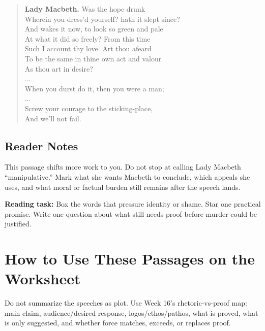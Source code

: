 \documentclass[12pt]{article}
\newenvironment{playpassage}{\begin{quote}\footnotesize\setlength{\parskip}{0.08em}\setlength{\parindent}{0pt}}{\end{quote}}
\newcommand{\speaker}[1]{\textbf{#1.}}
\begin{document}
\begin{playpassage}
\speaker{Lady Macbeth} Was the hope drunk\\
Wherein you dress'd yourself? hath it slept since?\\
And wakes it now, to look so green and pale\\
At what it did so freely? From this time\\
Such I account thy love. Art thou afeard\\
To be the same in thine own act and valour\\
As thou art in desire?\\
...\\
When you durst do it, then you were a man;\\
...\\
Screw your courage to the sticking-place,\\
And we'll not fail.
\end{playpassage}

\subsection*{Reader Notes}

This passage shifts more work to you. Do not stop at calling Lady Macbeth ``manipulative.'' Mark what she wants Macbeth to conclude, which appeals she uses, and what moral or factual burden still remains after the speech lands.

\textbf{Reading task:} Box the words that pressure identity or shame. Star one practical promise. Write one question about what still needs proof before murder could be justified.

\section*{How to Use These Passages on the Worksheet}

Do not summarize the speeches as plot. Use Week 16's rhetoric-vs-proof map: main claim, audience/desired response, logos/ethos/pathos, what is proved, what is only suggested, and whether force matches, exceeds, or replaces proof.
\end{document}
